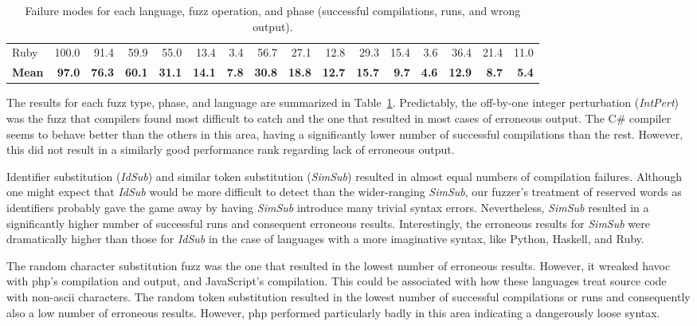 \documentclass[10pt]{sigplanconf}
\begin{document}
\begin{table}
\begin{center}
\begin{tabular}{ l r r r|r r r|r r r|r r r|r r r}
Ruby & 100.0 & 91.4 & 59.9  & 55.0 & 13.4 & 3.4  & 56.7 & 27.1 & 12.8  & 29.3 & 15.4 & 3.6  & 36.4 & 21.4 & 11.0 \\
\textbf{Mean} & \textbf{97.0} & \textbf{76.3} & \textbf{60.1}  & \textbf{31.1} & \textbf{14.1} & \textbf{7.8}  & \textbf{30.8} & \textbf{18.8} & \textbf{12.7}  & \textbf{15.7} & \textbf{9.7} & \textbf{4.6}  & \textbf{12.9} & \textbf{8.7} & \textbf{5.4} \\
\end{tabular}
\end{center}
\caption{Failure modes for each language, fuzz operation, and phase (successful compilations, runs, and wrong output).}
\label{tbl:aggregated-per-language}
\end{table}

The results for each fuzz type, phase, and language are summarized in
Table~\ref{tbl:aggregated-per-language}.
Predictably, the off-by-one integer perturbation ({\em IntPert})
was the fuzz that
compilers found most difficult to catch and the one that resulted
in most cases of erroneous output.
The C\# compiler seems to behave better than the others in this area,
having a significantly lower number of successful compilations than the
rest.
However, this did not result in a similarly good performance rank
regarding lack of erroneous output.

Identifier substitution ({\em IdSub}) and similar token substitution
({\em SimSub}) resulted in almost equal numbers of compilation failures.
Although one might expect that {\em IdSub} would be more difficult
to detect than the wider-ranging {\em SimSub},
our fuzzer's treatment of reserved words as identifiers
probably gave the game away by having {\em SimSub} introduce many
trivial syntax errors.
Nevertheless, {\em SimSub} resulted in a significantly higher number
of successful runs and consequent erroneous results.
Interestingly,
the erroneous results for {\em SimSub} were dramatically higher
than those for {\em IdSub} in the case of
languages with a more imaginative syntax, like Python, Haskell, and Ruby.

The random character substitution fuzz was the one that resulted in
the lowest number of erroneous results. However, it wreaked havoc with
{\sc php}'s compilation and output, and JavaScript's compilation. This
could be associated with how these languages treat source code with
non-{\sc ascii} characters. The random token substitution resulted in
the lowest number of successful compilations or runs and consequently
also a low number of erroneous results. However, {\sc php} performed
particularly badly in this area indicating a dangerously loose syntax.
\end{document}
